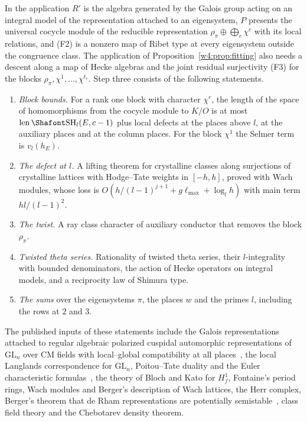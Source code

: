 In the application $R'$ is the algebra generated by the Galois group acting on an integral model of the representation attached to an eigensystem, $P$ presents the universal cocycle module of the reducible representation $\rho_\pi\oplus\bigoplus_c\chi^{c}$ with its local relations, and (F2) is a nonzero map of Ribet type at every eigensystem outside the congruence class. The application of Proposition~\ref{w4:prop:fitting} also needs a descent along a map of Hecke algebras and the joint residual surjectivity (F3) for the blocks $\rho_\pi,\chi^1,\dots,\chi^{t_r}$.  Step three consists of the following statements.
\begin{enumerate}[leftmargin=*,itemsep=2pt]
\item \emph{Block bounds.} For a rank one block with character $\chi^c$, the length of the space of homomorphisms from the cocycle module to $K/O$ is at most $\len\Sha_l(E,c-1)$ plus local defects at the places above $l$, at the auxiliary places and at the column places. For the block $\chi^1$ the Selmer term is $v_l(h_E)$.
\item \emph{The defect at $l$.} A lifting theorem for crystalline classes along surjections of crystalline lattices with Hodge--Tate weights in $[-h,h]$, proved with Wach modules, whose loss is $O(h/(l-1)^{j+1}+g\ell_{\max}+\log_lh)$ with main term $hl/(l-1)^2$.
\item \emph{The twist.} A ray class character of auxiliary conductor that removes the block $\rho_\pi$.
\item \emph{Twisted theta series.} Rationality of twisted theta series, their $l$-integrality with bounded denominators, the action of Hecke operators on integral models, and a reciprocity law of Shimura type.
\item \emph{The sums} over the eigensystems $\pi$, the places $w$ and the primes $l$, including the rows at $2$ and $3$.
\end{enumerate}
The published inputs of these statements include the Galois representations attached to regular algebraic polarized cuspidal automorphic representations of $\mathrm{GL}_n$ over CM fields with local--global compatibility at all places~\cite{blggt14}, the local Langlands correspondence for $\mathrm{GL}_n$, Poitou--Tate duality and the Euler characteristic formulas~\cite{nsw}, the theory of Bloch and Kato for $H^1_f$, Fontaine's period rings, Wach modules and Berger's description of Wach lattices, the Herr complex, Berger's theorem that de Rham representations are potentially semistable~\cite{berger02}, class field theory and the Chebotarev density theorem.

